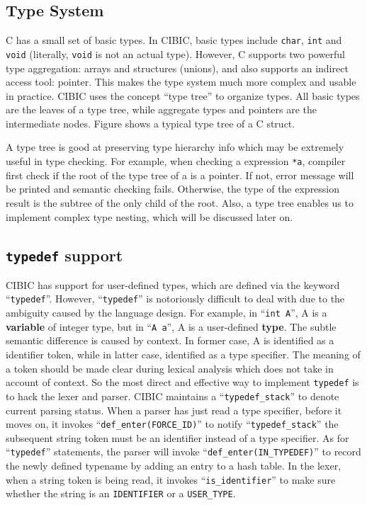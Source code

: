 \documentclass[10pt, a4paper]{article}
\begin{document}
\subsection{Type System}
C has a small set of basic types. In CIBIC, basic types include \texttt{char},
\texttt{int} and \texttt{void} (literally, \texttt{void} is not an actual
type). However, C supports two powerful type aggregation: arrays and structures
(unions), and also supports an indirect access tool: pointer. This makes the
type system much more complex and usable in practice. CIBIC uses the concept
``type tree'' to organize types. All basic types are the leaves of a type tree,
while aggregate types and pointers are the intermediate nodes. Figure shows a
typical type tree of a C struct.

A type tree is good at preserving type hierarchy info which may be extremely
useful in type checking. For example, when checking a expression \texttt{*a},
compiler first check if the root of the type tree of a is a pointer. If not,
error message will be printed and semantic checking fails. Otherwise, the type
of the expression result is the subtree of the only child of the root. Also, a
type tree enables us to implement complex type nesting, which will be discussed
later on.
\subsection{\texttt{typedef} support}
CIBIC has support for user-defined types, which are defined via the keyword
``\texttt{typedef}''.  However, ``\texttt{typedef}'' is notoriously difficult
to deal with due to the ambiguity caused by the language design. For example,
in ``\texttt{int A}'', A is a \textbf{variable} of integer type, but in
``\texttt{A a}'', A is a user-defined \textbf{type}. The subtle semantic
difference is caused by context. In former case, A is identified as a
identifier token, while in latter case, identified as a type specifier. The
meaning of a token should be made clear during lexical analysis which does not
take in account of context. So the most direct and effective way to implement
\texttt{typedef} is to hack the lexer and parser. CIBIC maintains a
``\texttt{typedef\_stack}'' to denote current parsing status. When a parser has
just read a type specifier, before it moves on, it invokes
``\texttt{def\_enter(FORCE\_ID)}'' to notify ``\texttt{typedef\_stack}'' the
subsequent string token must be an identifier instead of a type specifier. As
for ``\texttt{typedef}'' statements, the parser will invoke
``\texttt{def\_enter(IN\_TYPEDEF)}'' to record the newly defined typename by
adding an entry to a hash table. In the lexer, when a string token is being
read, it invokes ``\texttt{is\_identifier}'' to make sure whether the string is
an \texttt{IDENTIFIER} or a \texttt{USER\_TYPE}.
\end{document}
